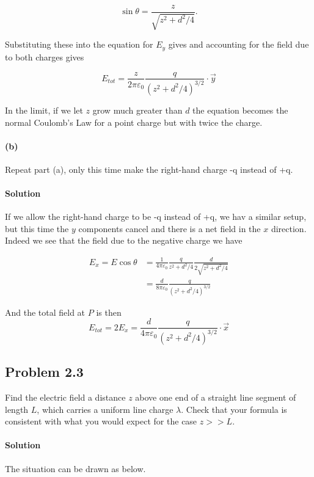 \documentclass{article}
\begin{document}
$$
\sin\theta = \frac{z}{\sqrt{z^2 + d^2/4}}.
$$

Substituting these into the equation for $E_y$ gives and accounting for the field due to both charges gives

$$
E_{tot} = \frac{z}{2\pi\varepsilon_0}\frac{q}{(z^2 + d^2/4)^{3/2}}\cdot\vec{y} 
$$

In the limit, if we let $z$ grow much greater than $d$ the equation becomes the normal Coulomb's Law for a point charge but with twice the charge. 

\paragraph{(b)} Repeat part (a), only this time make the right-hand charge -q instead of +q.

\paragraph{Solution} If we allow the right-hand charge to be -q instead of +q, we hav a similar setup, but this time the $y$ components cancel and there is a net field in the $x$ direction. Indeed we see that the field due to the negative charge we have

\begin{align*}
    E_x = E\cos \theta &= \frac{1}{4\pi\varepsilon_0}\frac{q}{z^2 + d^2/4}\frac{d}{2\sqrt{z^2 + d^2/4}}\\
    &= \frac{d}{8\pi\varepsilon_0}\frac{q}{(z^2 + d^2/4)^{3/2}}
\end{align*}

And the total field at $P$ is then 
$$
E_{tot} = 2E_x = \frac{d}{4\pi\varepsilon_0}\frac{q}{(z^2 + d^2/4)^{3/2}}\cdot \vec{x}
$$

\newpage

\subsection*{Problem 2.3}
Find the electric field a distance $z$ above one end of a straight line segment of length $L$, which carries a uniform line charge $\lambda$. Check that your formula is consistent with what you would expect for the case $z >> L$.

\paragraph{Solution} The situation can be drawn as below. 
\end{document}
